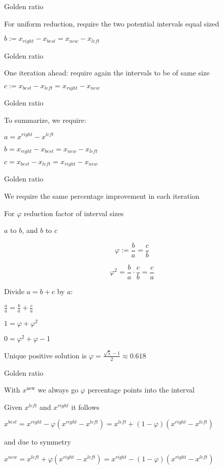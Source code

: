 \documentclass[11pt,compress,t,notes=noshow, xcolor=table]{beamer}
\begin{document}
\begin{framei}{Golden ratio}
  \item For uniform reduction, require the two potential intervals equal sized
  \item $b := x_{right} - x_{best} = x_{new} - x_{left}$
  \vfill
\end{framei}

\begin{framei}{Golden ratio}
  \item One iteration ahead: require again the intervals to be of same size
  \item $c := x_{best} - x_{left} = x_{right} - x_{new}$
  \vfill
\end{framei}

\begin{framei}{Golden ratio}
  \item To summarize, we require:
  \item $a = x^{right}-x^{left}$
  \item $b = x_{right} - x_{best} = x_{new} - x_{left}$
  \item $c = x_{best} - x_{left} = x_{right} - x_{new}$
  \vfill
\end{framei}

\begin{framei}{Golden ratio}
  \item We require the same percentage improvement in each iteration
  \item For $\varphi$ reduction factor of interval sizes
  \item $a$ to $b$, and $b$ to $c$
  \item $$\varphi := \frac{b}{a} = \frac{c}{b}$$
  \item $$\varphi^2 = \frac{b}{a} \cdot \frac{c}{b} = \frac{c}{a}$$
  \item Divide $a = b + c$ by $a$:
  \item $\frac{a}{a} = \frac{b}{a} + \frac{c}{a}$
  \item $1 = \varphi + \varphi^2$
  \item $0 = \varphi^2 + \varphi - 1$
  \item Unique positive solution is $\varphi = \frac{\sqrt{5}-1}{2} \approx 0.618$
\end{framei}

\begin{framei}{Golden ratio}
  \item With $x^{\text{new}}$ we always go $\varphi$ percentage points into the interval
  \item Given $x^{left}$ and $x^{right}$ it follows
  \item $x^{best} = x^{right}-\varphi(x^{right}-x^{left}) = x^{left}+(1-\varphi)(x^{right}-x^{left})$
  \item and due to symmetry
  \item $x^{new} = x^{left}+\varphi(x^{right}-x^{left}) = x^{right}-(1-\varphi)(x^{right}-x^{left})$
\end{framei}
\end{document}
